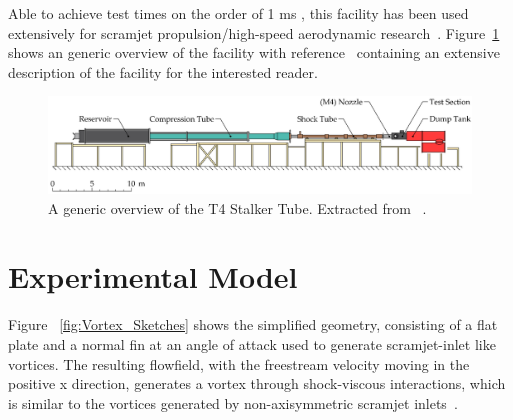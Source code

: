 \documentclass{AIAA}
\begin{document}
Able to achieve test times on the order of 1 ms \cite{Stalker_2005}, this facility has been used extensively for scramjet propulsion/high-speed aerodynamic research~\cite{Hunt2009, Wise2014b}.
Figure~\ref{fig:T4_Overview} shows an generic overview of the facility with reference~\cite{Doherty:PhD_Thesis_Scram_M10} containing an extensive description of the facility for the interested reader.

\begin{figure}[h]
\centering
	\includegraphics[trim = 0mm 0mm 0mm 0mm, clip, width=0.9\columnwidth]{Figures/T4_Shock_Tunnel_Luke_D_2013.eps}
	\caption{A generic overview of the T4 Stalker Tube. Extracted from ~\cite{Doherty:PhD_Thesis_Scram_M10}.}
	\label{fig:T4_Overview}	
\end{figure}


\section{Experimental Model}
	\label{sec:ModelDescription}

Figure ~\ref{fig:Vortex_Sketches} shows the simplified geometry, consisting of a flat plate and a normal fin at an angle of attack used to generate scramjet-inlet like vortices.
The resulting flowfield, with the freestream velocity moving in the positive x direction, generates a vortex through shock-viscous interactions, which is similar to the vortices generated by non-axisymmetric scramjet inlets~\cite{Llobet_PlumeElongation,AFMCpaper2014}.
\end{document}
